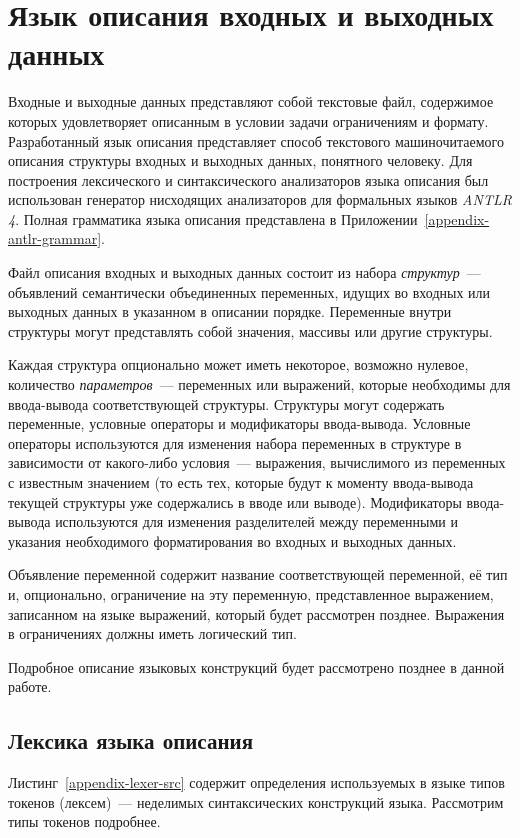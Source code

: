 \documentclass[times,specification,annotation]{style/itmo-student-thesis/itmo-student-thesis}
\begin{document}
\section{Язык описания входных и выходных данных}

Входные и выходные данных представляют собой текстовые файл, содержимое которых удовлетворяет описанным в условии задачи ограничениям и формату. Разработанный язык описания представляет способ текстового машиночитаемого описания структуры входных и выходных данных, понятного человеку. Для построения лексического и синтаксического анализаторов языка описания был использован генератор нисходящих анализаторов для формальных языков \textit{ANTLR 4}. Полная грамматика языка описания представлена в Приложении~\ref{appendix-antlr-grammar}.

Файл описания входных и выходных данных состоит из набора \textit{структур}~--- объявлений семантически объединенных переменных, идущих во входных или выходных данных в указанном в описании порядке. Переменные внутри структуры могут представлять собой значения, массивы или другие структуры.

Каждая структура опционально может иметь некоторое, возможно нулевое, количество \textit{параметров}~--- переменных или выражений, которые необходимы для ввода-вывода соответствующей структуры. Структуры могут содержать переменные, условные операторы и модификаторы ввода-вывода. Условные операторы используются для изменения набора переменных в структуре в зависимости от какого-либо условия~--- выражения, вычислимого из переменных с известным значением (то есть тех, которые будут к моменту ввода-вывода текущей структуры уже содержались в вводе или выводе). Модификаторы ввода-вывода используются для изменения разделителей между переменными и указания необходимого форматирования во входных и выходных данных.

Объявление переменной содержит название соответствующей переменной, её тип и, опционально, ограничение на эту переменную, представленное выражением, записанном на языке выражений, который будет рассмотрен позднее. Выражения в ограничениях должны иметь логический тип.

Подробное описание языковых конструкций будет рассмотрено позднее в данной работе.

\subsection{Лексика языка описания}

Листинг~\ref{appendix-lexer-src} содержит определения используемых в языке типов токенов (лексем)~--- неделимых синтаксических конструкций языка. Рассмотрим типы токенов подробнее.
\end{document}
